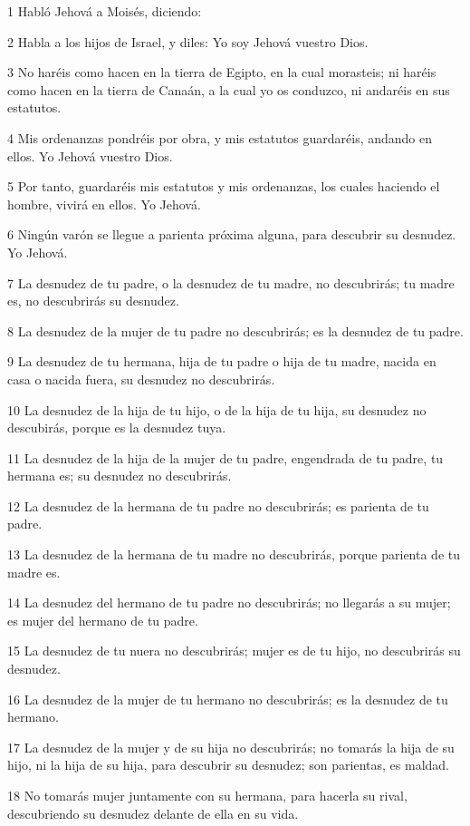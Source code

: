 \par 1 Habló Jehová a Moisés, diciendo:
\par 2 Habla a los hijos de Israel, y diles: Yo soy Jehová vuestro Dios.
\par 3 No haréis como hacen en la tierra de Egipto, en la cual morasteis; ni haréis como hacen en la tierra de Canaán, a la cual yo os conduzco, ni andaréis en sus estatutos.
\par 4 Mis ordenanzas pondréis por obra, y mis estatutos guardaréis, andando en ellos. Yo Jehová vuestro Dios.
\par 5 Por tanto, guardaréis mis estatutos y mis ordenanzas, los cuales haciendo el hombre, vivirá en ellos. Yo Jehová.
\par 6 Ningún varón se llegue a parienta próxima alguna, para descubrir su desnudez. Yo Jehová.
\par 7 La desnudez de tu padre, o la desnudez de tu madre, no descubrirás; tu madre es, no descubrirás su desnudez.
\par 8 La desnudez de la mujer de tu padre no descubrirás; es la desnudez de tu padre.
\par 9 La desnudez de tu hermana, hija de tu padre o hija de tu madre, nacida en casa o nacida fuera, su desnudez no descubrirás.
\par 10 La desnudez de la hija de tu hijo, o de la hija de tu hija, su desnudez no descubirás, porque es la desnudez tuya.
\par 11 La desnudez de la hija de la mujer de tu padre, engendrada de tu padre, tu hermana es; su desnudez no descubrirás.
\par 12 La desnudez de la hermana de tu padre no descubrirás; es parienta de tu padre.
\par 13 La desnudez de la hermana de tu madre no descubrirás, porque parienta de tu madre es.
\par 14 La desnudez del hermano de tu padre no descubrirás; no llegarás a su mujer; es mujer del hermano de tu padre.
\par 15 La desnudez de tu nuera no descubrirás; mujer es de tu hijo, no descubrirás su desnudez.
\par 16 La desnudez de la mujer de tu hermano no descubrirás; es la desnudez de tu hermano.
\par 17 La desnudez de la mujer y de su hija no descubrirás; no tomarás la hija de su hijo, ni la hija de su hija, para descubrir su desnudez; son parientas, es maldad.
\par 18 No tomarás mujer juntamente con su hermana, para hacerla su rival, descubriendo su desnudez delante de ella en su vida.
